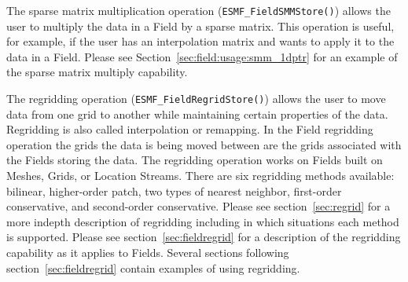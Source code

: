 The sparse matrix multiplication operation ({\tt ESMF\_FieldSMMStore()}) allows the user to multiply the data in a Field by a sparse matrix. This operation is useful, for example, if the user has an interpolation matrix and wants to apply it to the data in a Field. Please see Section~\ref{sec:field:usage:smm_1dptr}
for an example of the sparse matrix multiply capability.

The regridding operation ({\tt ESMF\_FieldRegridStore()}) allows the user to move data from one grid to another while maintaining certain properties
of the data. Regridding is also called interpolation or remapping. In the Field regridding operation the grids the data is being moved between
are the grids associated with the Fields storing the data. The regridding operation works on Fields built on Meshes, Grids, or Location Streams.  
There are six regridding methods available: bilinear, higher-order patch, two types of nearest neighbor, first-order conservative, and second-order conservative.
Please see section~\ref{sec:regrid} for a more indepth description of regridding including in which situations each method is supported. 
Please see section~\ref{sec:fieldregrid} for a description of the regridding capability as it applies to Fields. Several sections following section~\ref{sec:fieldregrid} 
contain examples of using regridding. 







